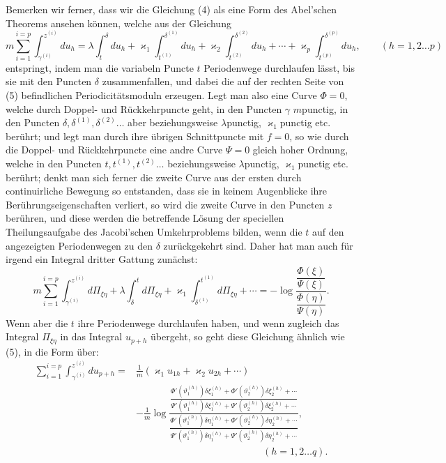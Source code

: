 \documentclass[10pt]{article}
\begin{document}
Bemerken wir ferner, dass wir die Gleichung (4) als eine Form des Abel'schen Theorems ansehen können, welche aus der Gleichung
\[
m\sum_{i=1}^{i=p}\int_{\gamma^{(i)}}^{z^{(i)}}du_h
=\lambda\int_t^{\delta}du_h+\varkappa_1\int_{t^{(1)}}^{\delta^{(1)}}du_h
+\varkappa_2\int_{t^{(2)}}^{\delta^{(2)}}du_h+\cdots+\varkappa_p\int_{t^{(p)}}^{\delta^{(p)}}du_h,
\qquad (h=1,2\ldots p)
\]
entspringt, indem man die variabeln Puncte \(t\) Periodenwege durchlaufen lässt, bis sie mit den Puncten \(\delta\) zusammenfallen, und dabei die auf der rechten Seite von (5) befindlichen Periodicitätsmoduln erzeugen. Legt man also eine Curve \(\Phi=0\), welche durch Doppel- und Rückkehrpuncte geht, in den Puncten \(\gamma\) \(m\)punctig, in den Puncten \(\delta,\delta^{(1)},\delta^{(2)}\ldots\) aber beziehungsweise \(\lambda\)punctig, \(\varkappa_1\)punctig etc. berührt; und legt man durch ihre übrigen Schnittpuncte mit \(f=0\), so wie durch die Doppel- und Rückkehrpuncte eine andre Curve \(\Psi=0\) gleich hoher Ordnung, welche in den Puncten \(t,t^{(1)},t^{(2)}\ldots\) beziehungsweise \(\lambda\)punctig, \(\varkappa_1\)punctig etc. berührt; denkt man sich ferner die zweite Curve aus der ersten durch continuirliche Bewegung so entstanden, dass sie in keinem Augenblicke ihre Berührungseigenschaften verliert, so wird die zweite Curve in den Puncten \(z\) berühren, und diese werden die betreffende Lösung der speciellen Theilungsaufgabe des Jacobi'schen Umkehrproblems bilden, wenn die \(t\) auf den angezeigten Periodenwegen zu den \(\delta\) zurückgekehrt sind. Daher hat man auch für irgend ein Integral dritter Gattung zunächst:
\[
m\sum_{i=1}^{i=p}\int_{\gamma^{(i)}}^{z^{(i)}}d\Pi_{\xi\eta}
+\lambda\int_{\delta}^{t}d\Pi_{\xi\eta}
+\varkappa_1\int_{\delta^{(1)}}^{t^{(1)}}d\Pi_{\xi\eta}+\cdots
=-\log\frac{\dfrac{\Phi(\xi)}{\Psi(\xi)}}{\dfrac{\Phi(\eta)}{\Psi(\eta)}}.
\]
Wenn aber die \(t\) ihre Periodenwege durchlaufen haben, und wenn zugleich das Integral \(\Pi_{\xi\eta}\) in das Integral \(u_{p+h}\) übergeht, so geht diese Gleichung ähnlich wie (5), in die Form über:
\[
\begin{aligned}
\sum_{i=1}^{i=p}\int_{\gamma^{(i)}}^{z^{(i)}}du_{p+h}
={}&\frac1m(\varkappa_1u_{1h}+\varkappa_2u_{2h}+\cdots)\\
&-\frac1m\log
\frac{\dfrac{\Phi'(\vartheta_1^{(h)})\delta\xi_1^{(h)}+\Phi'(\vartheta_2^{(h)})\delta\xi_2^{(h)}+\cdots}
{\Psi'(\vartheta_1^{(h)})\delta\xi_1^{(h)}+\Psi'(\vartheta_2^{(h)})\delta\xi_2^{(h)}+\cdots}}
{\dfrac{\Phi'(\vartheta_1^{(h)})\delta\eta_1^{(h)}+\Phi'(\vartheta_2^{(h)})\delta\eta_2^{(h)}+\cdots}
{\Psi'(\vartheta_1^{(h)})\delta\eta_1^{(h)}+\Psi'(\vartheta_2^{(h)})\delta\eta_2^{(h)}+\cdots}},\\
&\hspace{13em}(h=1,2\ldots q).
\end{aligned}
\]
\end{document}
